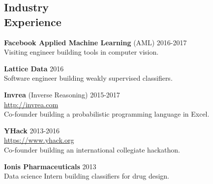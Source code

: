 \documentclass[margin, 10pt]{res} %
\begin{document}
\begin{resume}
\section{Industry \\ Experience}

\textbf{Facebook Applied Machine Learning} (AML) \hfill 2016-2017 \\
Visiting engineer building tools in computer vision.

\textbf{Lattice Data} \hfill 2016 \\
Software engineer building weakly supervised classifiers.

\textbf{Invrea} (Inverse Reasoning) \hfill 2015-2017 \\
\url{http://invrea.com} \\
Co-founder building a probabilistic programming language in Excel.

\textbf{YHack} \hfill 2013-2016 \\
\url{https://www.yhack.org} \\
Co-founder building an international collegiate hackathon.

\textbf{Ionis Pharmaceuticals} \hfill 2013 \\
Data science Intern building classifiers for drug design.


\end{resume}
\end{document}
